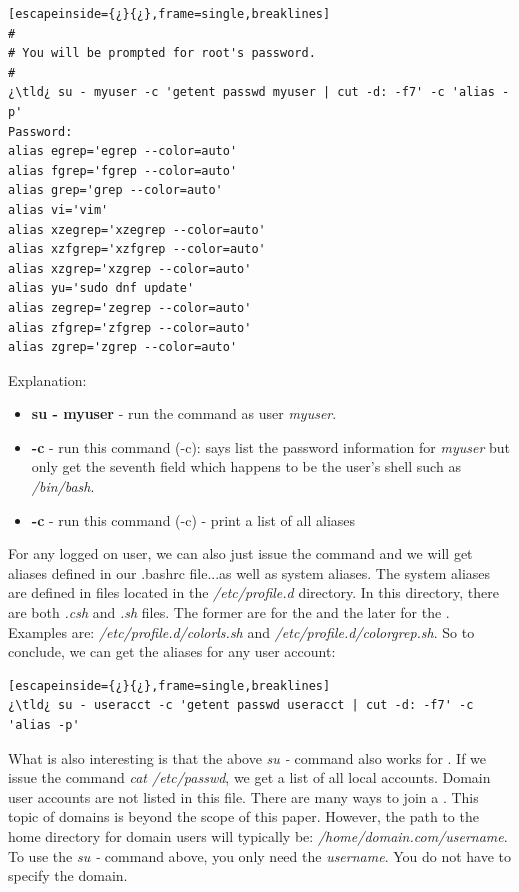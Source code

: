 \begin{lstlisting}[escapeinside={¿}{¿},frame=single,breaklines]
#
# You will be prompted for root's password.
#
¿\tld¿ su - myuser -c 'getent passwd myuser | cut -d: -f7' -c 'alias -p'
Password: 
alias egrep='egrep --color=auto'
alias fgrep='fgrep --color=auto'
alias grep='grep --color=auto'
alias vi='vim'
alias xzegrep='xzegrep --color=auto'
alias xzfgrep='xzfgrep --color=auto'
alias xzgrep='xzgrep --color=auto'
alias yu='sudo dnf update'
alias zegrep='zegrep --color=auto'
alias zfgrep='zfgrep --color=auto'
alias zgrep='zgrep --color=auto'
\end{lstlisting}

Explanation: 

\begin{itemize}
	\item \textbf{su - myuser} - run the command as user \emph{myuser}. 
	\item \textbf{-c } - run this command (-c):  says list the password information for \emph{myuser} but only get the seventh field which happens to be the user's shell such as \textsl{/bin/bash}.
	\item \textbf{-c } - run this command (-c) - print a list of all aliases
\end{itemize}

For any logged on user, we can also just issue the  command and we will get aliases defined in our \ttb{}.bashrc file...as well as system aliases. The system aliases are defined in files located in the \textsl{/etc/profile.d} directory. In this directory, there are both \textsl{.csh} and \textsl{.sh} files. The former are for the  and the later for the . Examples are: \textsl{/etc/profile.d/colorls.sh} and \textsl{/etc/profile.d/colorgrep.sh}. So to conclude, we can get the aliases for any user account:

\begin{lstlisting}[escapeinside={¿}{¿},frame=single,breaklines]
¿\tld¿ su - useracct -c 'getent passwd useracct | cut -d: -f7' -c 'alias -p'
\end{lstlisting}

What is also interesting is that the above \emph{su -} command also works for . If we issue the command \emph{cat /etc/passwd}, we get a list of all local accounts. Domain user accounts are not listed in this file. There are many ways to join a . This topic of domains is beyond the scope of this paper. However, the path to the home directory for domain users will typically be: \textsl{/home/domain.com/username}. To use the \emph{su -} command above, you only need the \emph{username}. You do not have to specify the domain.


